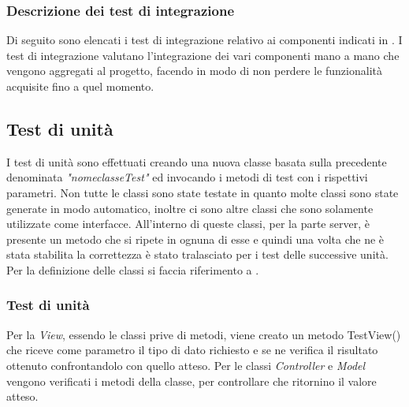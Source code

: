 \subsubsection{Descrizione dei test di integrazione}
Di seguito sono elencati i test di integrazione relativo ai componenti indicati in \infoST. I test di integrazione valutano l'integrazione dei vari componenti mano a mano che vengono aggregati al progetto, facendo in modo di non perdere le funzionalità acquisite fino a quel momento.

\subsection{Test di unità}
I test di unità sono effettuati creando una nuova classe basata sulla precedente denominata \textit{"nomeclasseTest"} ed invocando i metodi di test con i rispettivi parametri. 
Non tutte le classi sono state testate in quanto molte classi sono state generate in modo automatico, inoltre ci sono altre classi che sono solamente utilizzate come interfacce. All'interno di queste classi, per la parte server, è presente un metodo che si ripete in ognuna di esse e quindi una volta che ne è stata stabilita la correttezza è stato tralasciato per i test delle successive unità.
Per la definizione delle classi si faccia riferimento a \infoDP.
\subsubsection{Test di unità}

Per la \textit{View}, essendo le classi prive di metodi, viene creato un metodo TestView() che riceve come parametro il tipo di dato richiesto e se ne verifica il risultato ottenuto confrontandolo con quello atteso.
Per le classi \textit{Controller} e \textit{Model} vengono verificati i metodi della classe, per controllare che ritornino il valore atteso.

